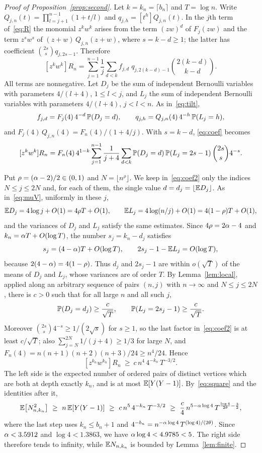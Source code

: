 \begin{proof}[Proof of Proposition~\ref{prop:second}]
Let $k=k_n=\lceil b_n\rceil$ and $T=\log n$. Write $Q_{j,n}(t)=\prod_{l=j+1}^{n-1}(1+t/l)$ and
$q_{j,h}=[t^h]Q_{j,n}(t)$. In the $j$th term of~\eqref{eq:R} the monomial $z^kw^k$ arises from the term $(zw)^d$ of
$F_j(zw)$ and the term $z^sw^s$ of $(z+w)\,Q_{j,n}(z+w)$, where $s=k-d\ge1$; the latter has coefficient
$\binom{2s}{s}q_{j,2s-1}$. Therefore
\begin{equation}\label{eq:coef}
[z^kw^k]R_n=\sum_{j=1}^{n-1}\frac1j\sum_{d<k}f_{j,d}\;q_{j,2(k-d)-1}\binom{2(k-d)}{k-d}.
\end{equation}
All terms are nonnegative. Let $D_j$ be the sum of independent Bernoulli variables with parameters $4/(l+4)$,
$1\le l<j$, and $L_j$ the sum of independent Bernoulli variables with parameters $4/(l+4)$, $j<l<n$. As
in~\eqref{eq:tilt},
\[
f_{j,d}=F_j(4)\,4^{-d}\,\mathbb{P}(D_j=d),\qquad q_{j,h}=Q_{j,n}(4)\,4^{-h}\,\mathbb{P}(L_j=h),
\]
and $F_j(4)\,Q_{j,n}(4)=F_n(4)/(1+4/j)$. With $s=k-d$, \eqref{eq:coef} becomes
\begin{equation}\label{eq:coef2}
[z^kw^k]R_n=F_n(4)\,4^{1-k}\sum_{j=1}^{n-1}\frac1{j+4}\sum_{d<k}\mathbb{P}(D_j=d)\,\mathbb{P}(L_j=2s-1)\,
\binom{2s}{s}4^{-s}.
\end{equation}

Put $\rho=(\alpha-2)/2\in(0,1)$ and $N=\lfloor n^{\rho}\rfloor$. We keep in~\eqref{eq:coef2} only the indices
$N\le j\le2N$ and, for each of them, the single value $d=d_j=\lfloor\mathbb{E} D_j\rfloor$. As in~\eqref{eq:muV}, uniformly
in these $j$,
\[
\mathbb{E} D_j=4\log j+O(1)=4\rho T+O(1),\qquad \mathbb{E} L_j=4\log(n/j)+O(1)=4(1-\rho)T+O(1),
\]
and the variances of $D_j$ and $L_j$ satisfy the same estimates. Since $4\rho=2\alpha-4$ and
$k_n=\alpha T+O(\log T)$, the number $s_j=k_n-d_j$ satisfies
\[
s_j=(4-\alpha)T+O(\log T),\qquad 2s_j-1-\mathbb{E} L_j=O(\log T),
\]
because $2(4-\alpha)=4(1-\rho)$. Thus $d_j$ and $2s_j-1$ are within $o(\sqrt T)$ of the means of $D_j$ and $L_j$, whose
variances are of order $T$. By Lemma~\ref{lem:local}, applied along an arbitrary sequence of pairs $(n,j)$ with
$n\to\infty$ and $N\le j\le2N$, there is $c>0$ such that for all large $n$ and all such $j$,
\[
\mathbb{P}(D_j=d_j)\ge\frac{c}{\sqrt T},\qquad\mathbb{P}(L_j=2s_j-1)\ge\frac{c}{\sqrt T} .
\]
Moreover $\binom{2s}{s}4^{-s}\ge1/(2\sqrt s)$ for $s\ge1$, so the last factor in~\eqref{eq:coef2} is at least
$c/\sqrt T$; also $\sum_{j=N}^{2N}1/(j+4)\ge1/3$ for large $N$, and $F_n(4)=n(n+1)(n+2)(n+3)/24\ge n^4/24$. Hence
\[
[z^{k_n}w^{k_n}]R_n\ \ge\ c\,n^4\,4^{-k_n}\,T^{-3/2}.
\]
The left side is the expected number of ordered pairs of distinct vertices which are both at depth exactly $k_n$, and
is at most $\mathbb{E}[Y(Y-1)]$. By~\eqref{eq:square} and the identities after it,
\[
\E\bigl[N_{n,k_n}^2\bigr]\ \ge\ n\,\E[Y(Y-1)]\ \ge\ c\,n^5\,4^{-k_n}\,T^{-3/2}
\ \ge\ \frac c4\,n^{5-\as\log4}\,T^{\frac{\log4}{2\theta}-\frac32},
\]
where the last step uses $k_n\le b_n+1$ and $4^{-b_n}=n^{-\alpha\log4}\,T^{(\log4)/(2\theta)}$. Since $\alpha<3.5912$ and
$\log4<1.3863$, we have $\alpha\log4<4.9785<5$. The right side therefore tends to infinity, while $\mathbb{E} N_{n,k_n}$ is
bounded by Lemma~\ref{lem:finite}.
\end{proof}


